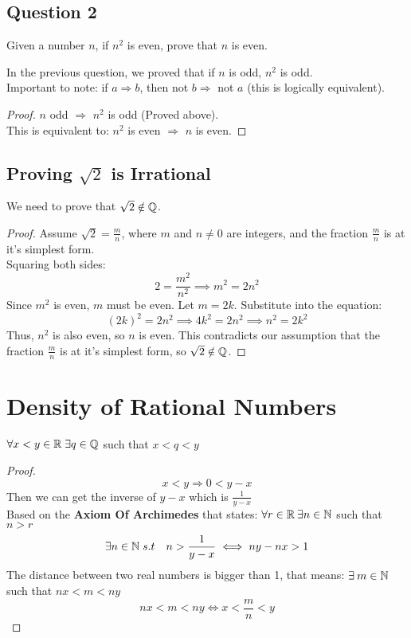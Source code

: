 \subsection{Question 2}
Given a number $n$, if $n^2$ is even, prove that $n$ is even.

\noindent In the previous question, we proved that if $n$ is odd, $n^2$ is odd.\\

\noindent Important to note: if $a \Longrightarrow b$, then not $b \Longrightarrow$ not $a$ (this is logically equivalent).\\
\begin{proof}
$n$ odd $\Longrightarrow$ $n^2$ is odd (Proved above).\\
This is equivalent to: $n^2$ is even $\Longrightarrow$ $n$ is even.
\end{proof}

\subsection{Proving $\sqrt{2}$ is Irrational}
We need to prove that \( \sqrt{2} \notin \mathbb{Q} \).

\begin{proof}
Assume \( \sqrt{2} = \frac{m}{n} \), where \( m \) and \( n\neq 0 \) are integers, and the fraction $\frac{m}{n}$ is at it's simplest form.\\  
Squaring both sides:
\[
2 = \frac{m^2}{n^2} \implies m^2 = 2n^2
\]
Since $m^2$ is even, $m$ must be even. Let $m = 2k$.  
Substitute into the equation:
\[
(2k)^2 = 2n^2 \implies 4k^2 = 2n^2 \implies n^2 = 2k^2
\]
Thus, $n^2$ is also even, so $n$ is even.  
This contradicts our assumption that the fraction $\frac{m}{n}$ is at it's simplest form, so $\sqrt{2} \notin \mathbb{Q}$.
\end{proof}


\section{Density of Rational Numbers}
$\forall x<y\in \mathbb{R} \; \exists q\in \mathbb{Q}$ such that $x<q<y$\\ 

\begin{proof}
    \[
        x<y \Longrightarrow 0 < y-x 
    \]
    Then we can get the inverse of $y-x$ which is $\frac{1}{y-x}$\\
    Based on the \textbf{Axiom Of Archimedes} that states: $\forall r\in \mathbb{R}\: \exists n\in \mathbb{N}$ such that $n>r$\\
    \[
        \exists n\in \mathbb{N}\; s.t \quad n>\frac{1}{y-x} \iff ny-nx>1
    \]
    The distance between two real numbers is bigger than 1, that means: $\exists \: m\in \mathbb{N}$ such that $nx<m<ny$\\
    \[
        nx<m<ny \iff x<\frac{m}{n}<y
    \]
\end{proof}

